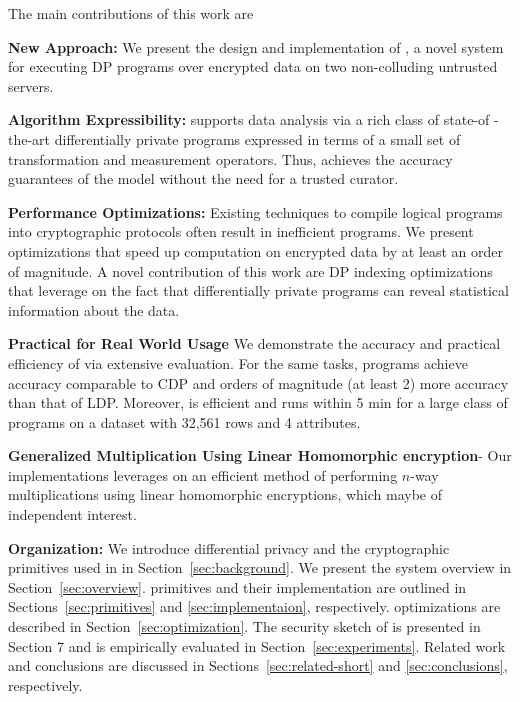 The main contributions of this work are
\squishlist
\item \textbf{New Approach:} We present the design and implementation of \system, a novel system for executing DP programs over encrypted data on two non-colluding untrusted servers. %
\item \textbf{Algorithm Expressibility:} \system supports data analysis via a rich class of state-of -the-art differentially private programs expressed in terms of a small set of transformation and measurement operators. Thus, \system achieves the accuracy guarantees of the \cdp model without the need for a trusted curator.  
\item \textbf{Performance Optimizations:} Existing techniques to compile logical \system programs into cryptographic protocols often result in inefficient programs. We present optimizations that speed up computation on encrypted data by at least an order of magnitude. A novel contribution of this work are DP indexing optimizations that leverage on the fact that differentially private programs can reveal statistical information about the data. 
\item \textbf{Practical for Real World Usage} We demonstrate the accuracy and practical efficiency of \system via extensive  evaluation. For the same tasks, \system programs achieve accuracy comparable to \textsf{CDP} and orders of magnitude (at least 2) more accuracy than that of \textsf{LDP}. Moreover, \system is efficient and runs within 5 min for a large class of programs on a dataset with 32,561 rows and 4 attributes. 
\item \textbf{Generalized Multiplication Using Linear Homomorphic encryption}- Our implementations leverages on an efficient method of performing $n$-way multiplications using linear homomorphic encryptions, which maybe of independent interest.
\squishend


\noindent\textbf{Organization:} We introduce differential privacy and the cryptographic primitives used in \system in Section~\ref{sec:background}. We present the system overview in Section~\ref{sec:overview}. \system primitives and their implementation are outlined in Sections~\ref{sec:primitives} and \ref{sec:implementaion}, respectively. \system optimizations  are described in Section~\ref{sec:optimization}. The security sketch of \system is presented in Section 7 and \system is empirically evaluated in Section~\ref{sec:experiments}. Related work and conclusions are discussed in Sections~\ref{sec:related-short} and \ref{sec:conclusions}, respectively.

